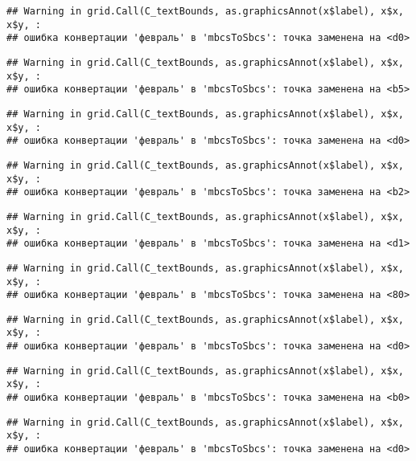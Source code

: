 \documentclass[
]{article}
\begin{document}
\begin{verbatim}
## Warning in grid.Call(C_textBounds, as.graphicsAnnot(x$label), x$x, x$y, :
## ошибка конвертации 'февраль' в 'mbcsToSbcs': точка заменена на <d0>
\end{verbatim}

\begin{verbatim}
## Warning in grid.Call(C_textBounds, as.graphicsAnnot(x$label), x$x, x$y, :
## ошибка конвертации 'февраль' в 'mbcsToSbcs': точка заменена на <b5>
\end{verbatim}

\begin{verbatim}
## Warning in grid.Call(C_textBounds, as.graphicsAnnot(x$label), x$x, x$y, :
## ошибка конвертации 'февраль' в 'mbcsToSbcs': точка заменена на <d0>
\end{verbatim}

\begin{verbatim}
## Warning in grid.Call(C_textBounds, as.graphicsAnnot(x$label), x$x, x$y, :
## ошибка конвертации 'февраль' в 'mbcsToSbcs': точка заменена на <b2>
\end{verbatim}

\begin{verbatim}
## Warning in grid.Call(C_textBounds, as.graphicsAnnot(x$label), x$x, x$y, :
## ошибка конвертации 'февраль' в 'mbcsToSbcs': точка заменена на <d1>
\end{verbatim}

\begin{verbatim}
## Warning in grid.Call(C_textBounds, as.graphicsAnnot(x$label), x$x, x$y, :
## ошибка конвертации 'февраль' в 'mbcsToSbcs': точка заменена на <80>
\end{verbatim}

\begin{verbatim}
## Warning in grid.Call(C_textBounds, as.graphicsAnnot(x$label), x$x, x$y, :
## ошибка конвертации 'февраль' в 'mbcsToSbcs': точка заменена на <d0>
\end{verbatim}

\begin{verbatim}
## Warning in grid.Call(C_textBounds, as.graphicsAnnot(x$label), x$x, x$y, :
## ошибка конвертации 'февраль' в 'mbcsToSbcs': точка заменена на <b0>
\end{verbatim}

\begin{verbatim}
## Warning in grid.Call(C_textBounds, as.graphicsAnnot(x$label), x$x, x$y, :
## ошибка конвертации 'февраль' в 'mbcsToSbcs': точка заменена на <d0>
\end{verbatim}
\end{document}
